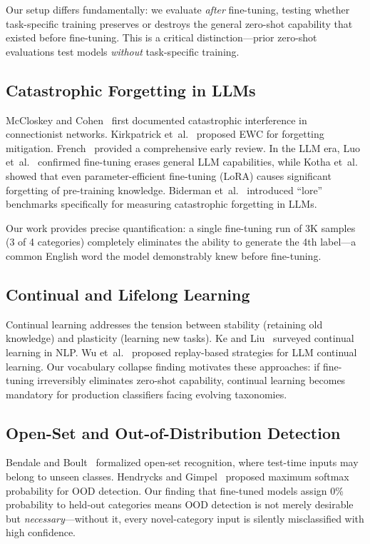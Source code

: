 \documentclass[journal]{IEEEtran}
\begin{document}
Our setup differs fundamentally: we evaluate \emph{after} fine-tuning, testing whether task-specific training preserves or destroys the general zero-shot capability that existed before fine-tuning. This is a critical distinction---prior zero-shot evaluations test models \emph{without} task-specific training.

\subsection{Catastrophic Forgetting in LLMs}
McCloskey and Cohen~\cite{mccloskey1989} first documented catastrophic interference in connectionist networks. Kirkpatrick et~al.~\cite{kirkpatrick2017} proposed EWC for forgetting mitigation. French~\cite{french1999} provided a comprehensive early review. In the LLM era, Luo et~al.~\cite{luo2023} confirmed fine-tuning erases general LLM capabilities, while Kotha et~al.~\cite{kotha2024} showed that even parameter-efficient fine-tuning (LoRA) causes significant forgetting of pre-training knowledge. Biderman et~al.~\cite{biderman2024} introduced ``lore'' benchmarks specifically for measuring catastrophic forgetting in LLMs.

Our work provides precise quantification: a single fine-tuning run of 3K samples (3 of 4 categories) completely eliminates the ability to generate the 4th label---a common English word the model demonstrably knew before fine-tuning.

\subsection{Continual and Lifelong Learning}
Continual learning addresses the tension between stability (retaining old knowledge) and plasticity (learning new tasks). Ke and Liu~\cite{ke2023} surveyed continual learning in NLP. Wu et~al.~\cite{wu2024} proposed replay-based strategies for LLM continual learning. Our vocabulary collapse finding motivates these approaches: if fine-tuning irreversibly eliminates zero-shot capability, continual learning becomes mandatory for production classifiers facing evolving taxonomies.

\subsection{Open-Set and Out-of-Distribution Detection}
Bendale and Boult~\cite{bendale2016} formalized open-set recognition, where test-time inputs may belong to unseen classes. Hendrycks and Gimpel~\cite{hendrycks2017} proposed maximum softmax probability for OOD detection. Our finding that fine-tuned models assign 0\% probability to held-out categories means OOD detection is not merely desirable but \emph{necessary}---without it, every novel-category input is silently misclassified with high confidence.
\end{document}
